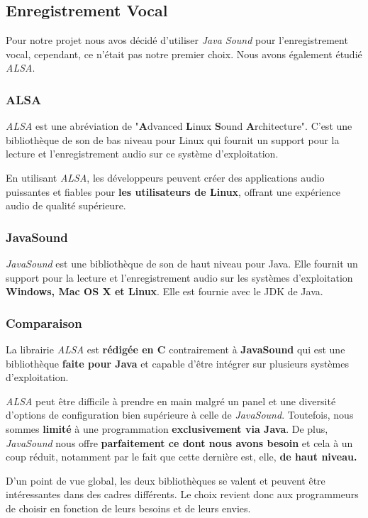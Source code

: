 \subsection{Enregistrement Vocal}
\label{subsec:javaSound}

Pour notre projet nous avos décidé d'utiliser \textit{Java Sound} pour l'enregistrement vocal, cependant,
ce n'était pas notre premier choix. Nous avons également étudié \textit{ALSA}.

\subsubsection*{ALSA}

\textit{ALSA} est une abréviation de "\textbf{A}dvanced \textbf{L}inux \textbf{S}ound \textbf{A}rchitecture". C'est une bibliothèque de son
de bas niveau pour Linux qui fournit un support pour la lecture et l'enregistrement audio sur ce système d'exploitation.

En utilisant \textit{ALSA}, les développeurs peuvent créer des applications audio puissantes et fiables pour \textbf{les utilisateurs de Linux},
offrant une expérience audio de qualité supérieure.\\

\subsubsection*{JavaSound}

\textit{JavaSound} est une bibliothèque de son de haut niveau pour Java. Elle fournit un support pour la lecture et l'enregistrement audio sur
les systèmes d'exploitation \textbf{Windows, Mac OS X et Linux}. Elle est fournie avec le JDK de Java.

\subsubsection*{Comparaison}
La librairie \textit{ALSA} est \textbf{rédigée en C} contrairement à \textbf{JavaSound} qui est une bibliothèque
\textbf{faite pour Java} et capable d'être intégrer sur plusieurs systèmes d'exploitation.

\textit{ALSA} peut être difficile à prendre en main malgré un panel et une diversité d'options de configuration bien supérieure à celle de \textit{JavaSound}.
Toutefois, nous sommes \textbf{limité} à une programmation \textbf{exclusivement via Java}. De plus, \textit{JavaSound} nous offre \textbf{parfaitement ce
    dont nous avons besoin} et cela à un coup réduit, notamment par le fait que cette dernière est, elle, \textbf{de haut niveau.}

D'un point de vue global, les deux bibliothèques se valent et peuvent être intéressantes dans des cadres différents.
Le choix revient donc aux programmeurs de choisir en fonction de leurs besoins et de leurs envies.
